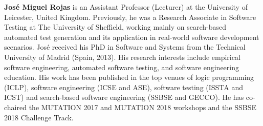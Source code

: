\documentclass[10pt,conference]{IEEEtran}
\newcommand{\TODO}[1]{\textbf{\textcolor{ScarletRed}{[TODO: #1]}}\xspace}
\newcommand{\TODO}[1]{}
\begin{document}
{\bf Jos\'e Miguel Rojas} is an Assistant Professor (Lecturer) at the
University of Leicester, United Kingdom. Previously, he was a Research
Associate in Software Testing at The University of Sheffield, working
mainly on search-based automated test generation and its application
in real-world software development scenarios. Jos\'e received his PhD
in Software and Systems from the Technical University of Madrid
(Spain, 2013). His research interests include empirical software
engineering, automated software testing, and software engineering
education. His work has been published in the top venues of logic
programming (ICLP), software engineering (ICSE and ASE), software
testing (ISSTA and ICST) and search-based software engineering (SSBSE
and GECCO). He has co-chaired the MUTATION 2017 and MUTATION 2018
workshops and the SSBSE 2018 Challenge Track.







\end{document}
